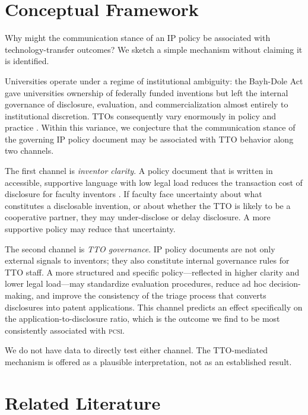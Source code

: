 \documentclass[12pt]{article}
\newcommand{\PCSI}{\textsc{pcsi}}
\begin{document}
\section{Conceptual Framework}
\label{sec:framework}

Why might the communication stance of an IP policy be associated with technology-transfer
outcomes? We sketch a simple mechanism without claiming it is identified.

Universities operate under a regime of institutional ambiguity: the Bayh-Dole Act
\citep{mowery2001} gave universities ownership of federally funded inventions but left
the internal governance of disclosure, evaluation, and commercialization almost entirely
to institutional discretion. TTOs consequently vary enormously in policy and practice
\citep{siegel2003, siegel2004, thursby2002}. Within this variance, we conjecture that the
communication stance of the governing IP policy document may be associated with TTO
behavior along two channels.

The first channel is \emph{inventor clarity}. A policy document that is written in
accessible, supportive language with low legal load reduces the transaction cost of
disclosure for faculty inventors \citep{jensenthursby2001, thursbythursby2002}. If
faculty face uncertainty about what constitutes a disclosable invention, or about whether
the TTO is likely to be a cooperative partner, they may under-disclose or delay disclosure.
A more supportive policy may reduce that uncertainty.

The second channel is \emph{TTO governance}. IP policy documents are not only external
signals to inventors; they also constitute internal governance rules for TTO staff.
A more structured and specific policy---reflected in higher clarity and lower legal
load---may standardize evaluation procedures, reduce ad hoc decision-making, and improve
the consistency of the triage process that converts disclosures into patent applications.
This channel predicts an effect specifically on the application-to-disclosure ratio, which
is the outcome we find to be most consistently associated with \PCSI{}.

We do not have data to directly test either channel. The TTO-mediated mechanism is offered
as a plausible interpretation, not as an established result.

\section{Related Literature}
\label{sec:literature}
\end{document}
